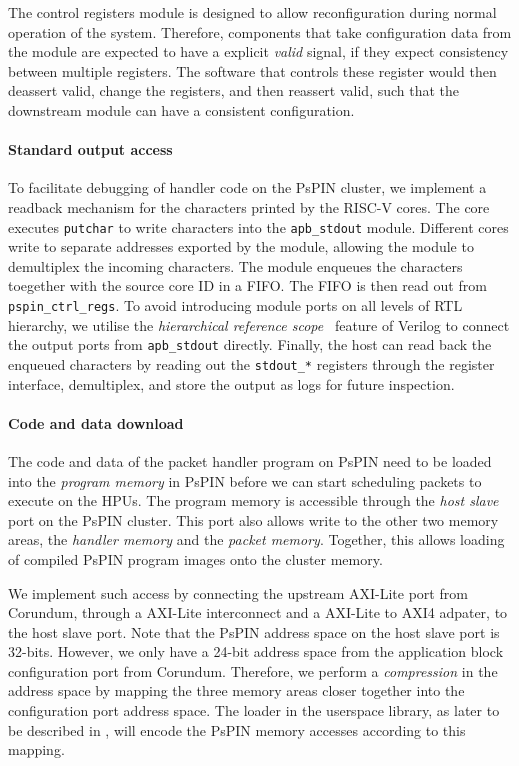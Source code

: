 The control registers module is designed to allow reconfiguration during normal operation of the system.  Therefore, components that take configuration data from the module are expected to have a explicit \emph{valid} signal, if they expect consistency between multiple registers.  The software that controls these register would then deassert valid, change the registers, and then reassert valid, such that the downstream module can have a consistent configuration.

\paragraph{Standard output access} To facilitate debugging of handler code on the PsPIN cluster, we implement a readback mechanism for the characters printed by the RISC-V cores.  The core executes \texttt{putchar} to write characters into the \texttt{apb\_stdout} module.  Different cores write to separate addresses exported by the module, allowing the module to demultiplex the incoming characters.  The module enqueues the characters toegether with the source core ID in a FIFO.  The FIFO is then read out from \texttt{pspin\_ctrl\_regs}.  To avoid introducing module ports on all levels of RTL hierarchy, we utilise the \emph{hierarchical reference scope}~\cite{noauthor_verilog_nodate} feature of Verilog to connect the output ports from \texttt{apb\_stdout} directly.  Finally, the host can read back the enqueued characters by reading out the \texttt{stdout\_*} registers through the register interface, demultiplex, and store the output as logs for future inspection.

\paragraph{Code and data download} The code and data of the packet handler program on PsPIN need to be loaded into the \emph{program memory} in PsPIN before we can start scheduling packets to execute on the HPUs.  The program memory is accessible through the \emph{host slave} port on the PsPIN cluster.  This port also allows write to the other two memory areas, the \emph{handler memory} and the \emph{packet memory}.  Together, this allows loading of compiled PsPIN program images onto the cluster memory.

We implement such access by connecting the upstream AXI-Lite port from Corundum, through a AXI-Lite interconnect and a AXI-Lite to AXI4 adpater, to the host slave port.  Note that the PsPIN address space on the host slave port is 32-bits.  However, we only have a 24-bit address space from the application block configuration port from Corundum.  Therefore, we perform a \emph{compression} in the address space by mapping the three memory areas closer together into the configuration port address space.  The loader in the userspace library, as later to be described in , will encode the PsPIN memory accesses according to this mapping.

